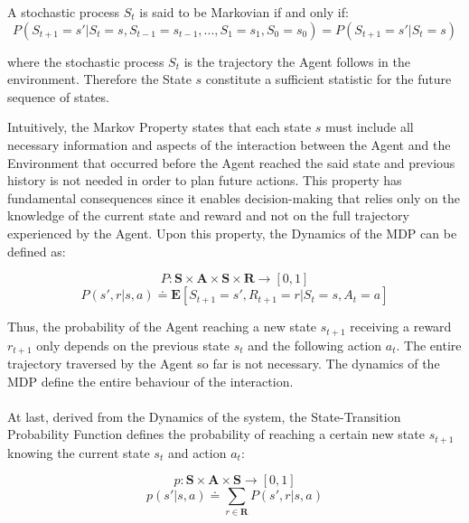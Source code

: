             \begin{definition}
                \label{def:markov}
                A stochastic process $S_{t}$ is said to be Markovian if and only if:
                \[ P \left( S_{t+1} = s' | S_{t} = s, S_{t-1} = s_{t-1}, ..., S_{1} = s_1, S_{0} = s_0 \right) = P \left( S_{t+1} = s' | S_{t} = s \right)\]
                
                where the stochastic process $S_t$ is the trajectory the Agent follows in the environment. Therefore the State $s$ constitute a sufficient statistic for the future sequence of states.
            \end{definition}
            Intuitively, the Markov Property states that each state $s$ must include all necessary information and aspects of the interaction between the Agent and the Environment that occurred before the Agent reached the said state and previous history is not needed in order to plan future actions. \newline
            This property has fundamental consequences since it enables decision-making that relies only on the knowledge of the current state and reward and not on the full trajectory experienced by the Agent. Upon this property, the Dynamics of the MDP can be defined as: 
            
            \begin{definition}
                \label{def:dynamics}
                \[P : \mathbf{S} \times \mathbf{A} \times \mathbf{S} \times \mathbf{R} \rightarrow [0, 1] \]
                \[P(s', r | s, a) \doteq \mathbf{E} \left[S_{t+1}=s', R_{t+1}=r | S_t=s, A_t=a \right]\]
            \end{definition}
            
            Thus, the probability of the Agent reaching a new state $s_{t+1}$ receiving a reward $r_{t+1}$ only depends on the previous state $s_t$ and the following action $a_t$. The entire trajectory traversed by the Agent so far is not necessary. The dynamics of the MDP define the entire behaviour of the interaction.
            \\\\
            At last, derived from the Dynamics of the system, the State-Transition Probability Function defines the probability of reaching a certain new state $s_{t+1}$ knowing the current state $s_t$ and action $a_t$:
            
            \begin{definition}
                \label{def:transprob}
                \[p : \mathbf{S} \times \mathbf{A} \times \mathbf{S} \rightarrow [0, 1] \]
                \[ p(s' | s, a) \doteq \sum_{r\in \mathbf{R}} P(s', r | s, a) \]
            \end{definition}
            
